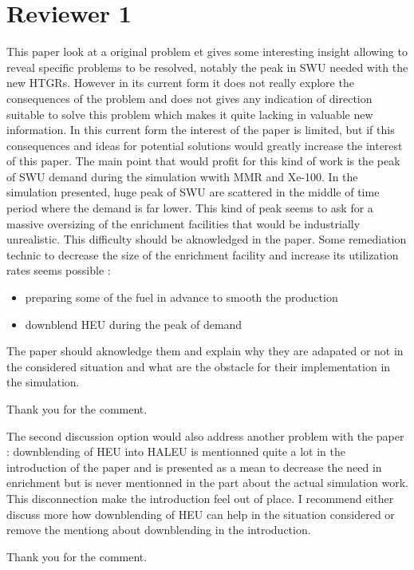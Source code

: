 \documentclass[answers,11pt]{exam}
\begin{document}
\section*{Reviewer 1}
\begin{questions}

        \question This paper look at a original problem et gives some 
        interesting insight allowing to reveal specific problems to be resolved, 
        notably the peak in SWU needed with the new HTGRs. However in its 
        current form it does not really explore the consequences of the problem 
        and does not gives any indication of direction suitable to solve this 
        problem which makes it quite lacking in valuable new information.
        In this current form the interest of the paper is limited, but if this 
        consequences and ideas for potential solutions would greatly increase 
        the interest of this paper. The main point that would profit for this 
        kind of work is the peak of SWU demand during the simulation wwith MMR 
        and Xe-100. In the simulation presented, huge peak of SWU are scattered 
        in the middle of time period where the demand is far lower. This kind of 
        peak seems to ask for a massive oversizing of the enrichment facilities 
        that would be industrially unrealistic. This difficulty should be 
        aknowledged in the paper. Some remediation technic to decrease the 
        size of the enrichment facility and increase its utilization rates seems 
        possible :
        \begin{itemize}
                \item preparing some of the fuel in advance to smooth the production
                \item downblend HEU during the peak of demand 
        \end{itemize}
        The paper should aknowledge them and explain why they are adapated or 
        not in the considered situation and what are the obstacle for their 
        implementation in the simulation.
        \begin{solution}
                Thank you for the comment. 
        \end{solution}

        \question The second discussion option would also address another problem 
        with the paper : downblending of HEU into HALEU is mentionned quite a lot 
        in the introduction of the paper and is presented as a mean to decrease 
        the need in enrichment but is never mentionned in the part about the actual 
        simulation work. This disconnection make the introduction feel out of place.
        I recommend either discuss more how downblending of HEU can help in the 
        situation considered or remove the mentiong about downblending in the 
        introduction.
        \begin{solution}
                Thank you for the comment. 
        \end{solution}
        

\end{questions}
\end{document}
